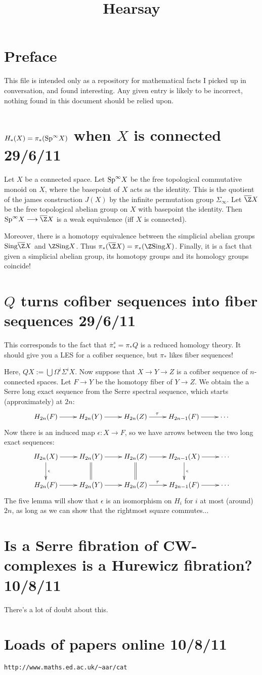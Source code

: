 \documentclass[11pt]{article}
\title{Hearsay}
\author{}
\date{}
\begin{document}
\newcommand{\HSsection}[2]{\section*{#1 \hfill \small{#2}}}

\HSsection{Preface}{}
This file is intended only as a repository for mathematical facts I picked up in conversation, and found interesting. Any given entry is likely to be incorrect, nothing found in this document should be relied upon.

\HSsection{$H_*(X)=\pi_*(\textup{Sp}^\infty X)$ when $X$ is connected}{29/6/11}
Let $X$ be a connected space. Let $\textup{Sp}^\infty X$ be the free topological commutative monoid on $X$, where the basepoint of $X$ acts as the identity. This is the quotient of the james construction $J(X)$ by the infinite permutation group $\Sigma_\infty$. Let $\overline\Z X$ be the free topological abelian group on $X$ with basepoint the identity. Then $\textup{Sp}^\infty X\to \overline\Z X$ is a weak equivalence (iff $X$ is connected).

Moreover, there is a homotopy equivalence between the simplicial abelian groups $\textup{Sing}\overline\Z X$ and $\Z\textup{Sing}X$. Thus $\pi_*(\overline\Z X)=\pi_*(\Z\textup{Sing}X)$. Finally, it is a fact that given a simplicial abelian group, its homotopy groups and its homology groups coincide!


\HSsection{$Q$ turns cofiber sequences into fiber sequences}{29/6/11}
This corresponds to the fact that $\overline\pi_*^s=\pi_*Q$ is a reduced homology theory. It should give you a LES for a cofiber sequence, but $\pi_*$ likes fiber sequences!

Here, $QX:=\bigcup\Omega^i\Sigma^i X$. Now suppose that $X\to Y\to Z$ is a cofiber sequence of $n$-connected spaces. Let $F\to Y$ be the homotopy fiber of $Y\to Z$.  We obtain the a Serre long exact sequence from the Serre spectral sequence, which starts (approximately) at $2n$:
\[\xymatrix{
H_{2n}(F)\ar[r]&H_{2n}(Y)\ar[r]&H_{2n}(Z)\ar[r]^{\tau\ \ }&H_{2n-1}(F)\ar[r]&\cdots
}\]
Now there is an induced map $\epsilon:X\to F$, so we have arrows between the two long exact sequences:
\[\xymatrix{
H_{2n}(X)\ar[r]\ar[d]^\epsilon&H_{2n}(Y)\ar[r]\ar@{=}[d]&H_{2n}(Z)\ar[r]^{\ \ }\ar@{=}[d]&H_{2n-1}(X)\ar[r]\ar[d]^\epsilon&\cdots\\
H_{2n}(F)\ar[r]&H_{2n}(Y)\ar[r]&H_{2n}(Z)\ar[r]^{\tau\ \ }&H_{2n-1}(F)\ar[r]&\cdots
}\]
The five lemma will show that $\epsilon$ is an isomorphism on $H_{i}$ for $i$ at most (around) $2n$, as long as we can show that the rightmost square commutes...
\HSsection{Is a Serre fibration of CW-complexes is a Hurewicz fibration?}{10/8/11}
There's a lot of doubt about this.
\HSsection{Loads of papers online}{10/8/11}
\verb|http://www.maths.ed.ac.uk/~aar/cat|
\end{document}
